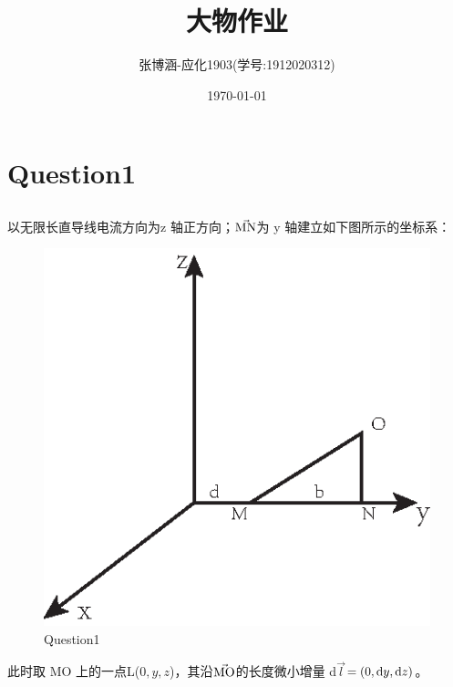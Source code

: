 \documentclass[AutoFakeBold]{article}
\title{大物作业}
\author{张博涵-应化1903(学号:1912020312)}
\date{\today}
\begin{document}
\maketitle

\section{Question1}
\subsection{ }
以无限长直导线电流方向为z 轴正方向；$\displaystyle\va{\ce{MN}}$为 y 轴建立如下图所示的坐标系：

\begin{center}
\begin{figure}[h]
	\centering
	\includegraphics[scale = 0.7]{f1}
	\caption{Question1}
\end{figure}
\end{center}
此时取 MO 上的一点L($0,y,z$)，其沿$\va{\ce{MO}}$的长度微小增量 d$\vec{l}$$ = (0,\ce{d}y,\ce{d}z)$。
\end{document}
